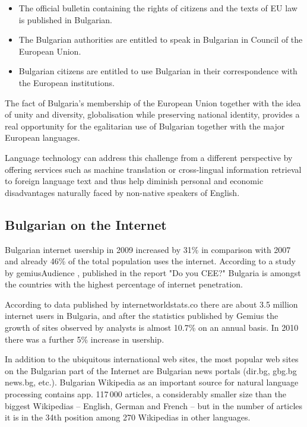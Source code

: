 \documentclass[]{../../metanetpaper}
\begin{document}
\begin{multicols}{2}
\begin{itemize}
\item The official bulletin containing the rights of citizens and the texts of EU law is published in Bulgarian.
\item The Bulgarian authorities are entitled to speak in Bulgarian in Council of the European Union.
\item Bulgarian citizens are entitled to use Bulgarian in their correspondence with the European institutions.
\end{itemize}

The fact of Bulgaria’s membership of the European Union together with the idea of unity and diversity, globalisation while preserving national identity, provides a real opportunity for the egalitarian use of Bulgarian together with the major European languages.

Language technology can address this challenge from a different perspective by offering services such as machine translation or cross-lingual information retrieval to foreign language text and thus help diminish personal and economic disadvantages naturally faced by non-native speakers of English.


\subsection{Bulgarian on the Internet}

Bulgarian internet usership in 2009 increased by 31\% in comparison with 2007 and already 46\% of the total population uses the internet. According to a study by gemiusAudience \cite{gemius}, published in the report "Do you CEE?" \cite{inetcee} Bulgaria is amongst the countries with the highest percentage of internet penetration.

According to data published by internetworldstats.co \cite{inetworldstat} there are about 3.5 million internet users in Bulgaria, and after the statistics published by Gemius the growth of sites observed by analysts is almost 10.7\% on an annual basis. In 2010 there was a further 5\% increase in usership.

In addition to the ubiquitous international web sites, the most popular web sites on the Bulgarian part of the Internet are Bulgarian news portals (dir.bg, gbg.bg news.bg, etc.). Bulgarian Wikipedia as an important source for natural language processing contains app. 117\,000 articles, a considerably smaller size than the biggest Wikipedias – English, German and French – but in the number of articles it is in the 34th position \cite{metadata} among 270 Wikipedias in other languages. 


\end{multicols}
\end{document}
